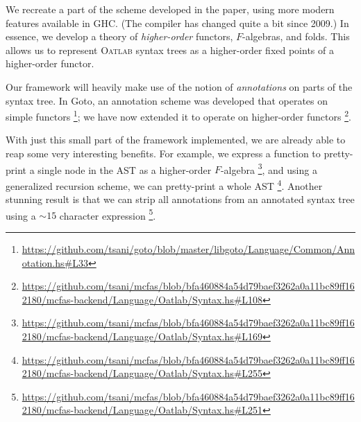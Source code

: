 \documentclass[letterpaper,11pt]{article}
\newcommand{\oatlab}{\textsc{Oatlab}}
\begin{document}
We recreate a part of the scheme developed in the paper, using more modern
features available in GHC. (The compiler has changed quite a bit since 2009.)
In essence, we develop a theory of \emph{higher-order} functors, $F$-algebras,
and folds. This allows us to represent \oatlab{} syntax trees as a higher-order
fixed points of a higher-order functor.

Our framework will heavily make use of the notion of \emph{annotations} on
parts of the syntax tree. In Goto, an annotation scheme was developed that
operates on simple functors
\footnote{\url{https://github.com/tsani/goto/blob/master/libgoto/Language/Common/Annotation.hs\#L33}};
we have now extended it to operate on higher-order functors
\footnote{\url{https://github.com/tsani/mcfas/blob/bfa460884a54d79baef3262a0a11bc89ff162180/mcfas-backend/Language/Oatlab/Syntax.hs\#L108}}.

With just this small part of the framework implemented, we are already able to
reap some very interesting benefits. For example, we express a function to
pretty-print a single node in the AST as a higher-order $F$-algebra
\footnote{\url{https://github.com/tsani/mcfas/blob/bfa460884a54d79baef3262a0a11bc89ff162180/mcfas-backend/Language/Oatlab/Syntax.hs\#L169}},
and using a generalized recursion scheme, we can pretty-print a whole AST
\footnote{\url{https://github.com/tsani/mcfas/blob/bfa460884a54d79baef3262a0a11bc89ff162180/mcfas-backend/Language/Oatlab/Syntax.hs\#L255}}.
Another stunning result is that we can strip all annotations from an annotated
syntax tree using a $\sim 15$ character expression
\footnote{\url{https://github.com/tsani/mcfas/blob/bfa460884a54d79baef3262a0a11bc89ff162180/mcfas-backend/Language/Oatlab/Syntax.hs\#L251}}.
\end{document}
